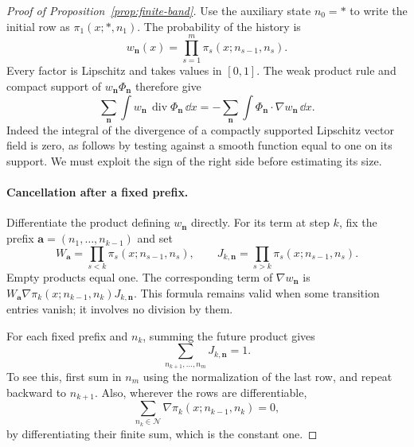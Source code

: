 \begin{proof}[Proof of Proposition~\ref{prop:finite-band}]
Use the auxiliary state $n_0=*$ to write the initial row as
$\pi_1(x;*,n_1)$. The probability of the history is
\[
 w_{\mathbf n}(x)=\prod_{s=1}^m\pi_s(x;n_{s-1},n_s).
\]
Every factor is Lipschitz and takes values in $[0,1]$. The weak
product rule and compact support of $w_{\mathbf n}\Phi_{\mathbf n}$
therefore give
\begin{equation}\label{eq:weighted-ibp}
 \sum_{\mathbf n}\int w_{\mathbf n}\,
                       \operatorname{div}\Phi_{\mathbf n}\,\dd x
 =-\sum_{\mathbf n}\int
                       \Phi_{\mathbf n}\cdot\nabla w_{\mathbf n}\,\dd x.
\end{equation}
Indeed the integral of the divergence of a compactly supported
Lipschitz vector field is zero, as follows by testing against a
smooth function equal to one on its support. We must exploit the
sign of the right side before estimating its size.

\paragraph{Cancellation after a fixed prefix.}
Differentiate the product defining $w_{\mathbf n}$ directly. For
its term at step $k$, fix the prefix
$\mathbf a=(n_1,\ldots,n_{k-1})$ and set
\[
 W_{\mathbf a}=\prod_{s<k}\pi_s(x;n_{s-1},n_s),
 \qquad
 J_{k,\mathbf n}=\prod_{s>k}\pi_s(x;n_{s-1},n_s).
\]
Empty products equal one. The corresponding term of
$\nabla w_{\mathbf n}$ is
$W_{\mathbf a}\nabla\pi_k(x;n_{k-1},n_k)J_{k,\mathbf n}$.
This formula remains valid when some transition entries vanish;
it involves no division by them.

For each fixed prefix and $n_k$, summing the future product gives
\begin{equation}\label{eq:future-normalization}
 \sum_{n_{k+1},\ldots,n_m}J_{k,\mathbf n}=1.
\end{equation}
To see this, first sum in $n_m$ using the normalization of the last
row, and repeat backward to $n_{k+1}$. Also, wherever the rows are
differentiable,
\begin{equation}\label{eq:row-derivative-zero}
 \sum_{n_k\in\mathcal N}\nabla\pi_k(x;n_{k-1},n_k)=0,
\end{equation}
by differentiating their finite sum, which is the constant one.


\end{proof}
